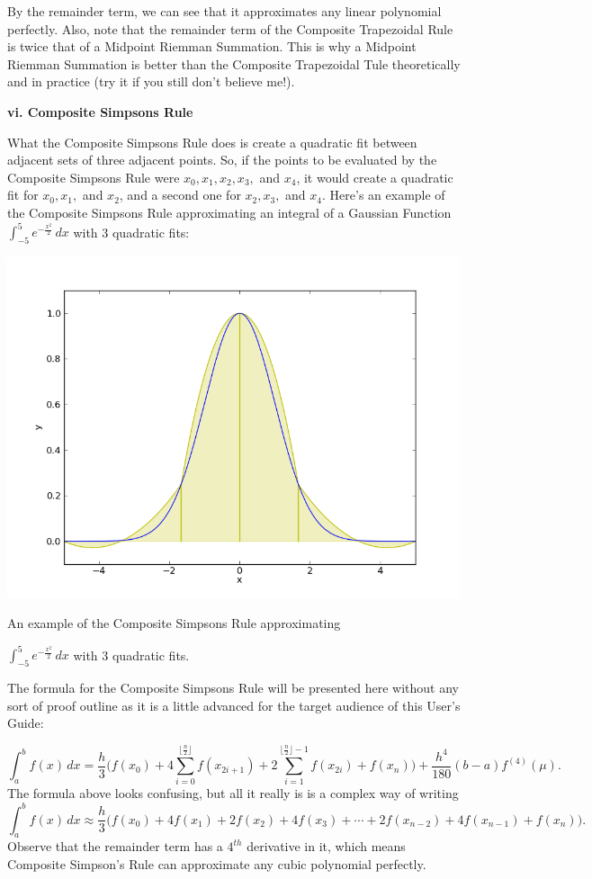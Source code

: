 \documentclass[12pt]{article}
\newcommand{\newLine}{\vspace{5mm}}
\newcommand{\nextsubsection}[1]{\newLine \noindent \large \textbf{#1} \normalsize}
\newcommand{\integral}[3]{\text{$\int^{#2}_{#1} #3\,dx$}}
\newcommand{\summation}[3]{\text{$\sum^{#2}_{#1} #3$}}
\newcommand{\floor}[1]{\text{$\lfloor#1\rfloor$}}
\begin{document}
By the remainder term, we can see that it approximates any linear polynomial perfectly. Also, note that the remainder term of the Composite Trapezoidal Rule is twice that of a Midpoint Riemman Summation. This is why a Midpoint Riemman Summation is better than the Composite Trapezoidal Tule theoretically and in practice (try it if you still don't believe me!).

\nextsubsection{vi. Composite Simpsons Rule}

\newLine What the Composite Simpsons Rule does is create a quadratic fit between adjacent sets of three adjacent points. So, if the points to be evaluated by the Composite Simpsons Rule were $x_0,x_1,x_2,x_3,$ and $x_4$, it would create a quadratic fit for $x_0, x_1,$ and $x_2$, and a second one for $x_2,x_3,$ and $x_4$. Here's an example of the Composite Simpsons Rule approximating an integral of a Gaussian Function $\integral{-5}{5}{e^{-\frac{x^2}{2}}}$ with 3 quadratic fits:

\begin{center} \includegraphics[scale = 0.5]{gaussianSimpsons.png} 

\small An example of the Composite Simpsons Rule approximating 

$\integral{-5}{5}{e^{-\frac{x^2}{2}}}$ with 3 quadratic fits.\normalsize
\end{center}
The formula for the Composite Simpsons Rule will be presented here without any sort of proof outline as it is a little advanced for the target audience of this User's Guide:

\begin{equation*}  \integral{a}{b}{f(x)} = \frac{h}{3}\Big(f(x_0) + 4\summation{i=0}{\floor{\frac{n}{2}}}{f(x_{2i+1})} + 2\summation{i=1}{\floor{\frac{n}{2}}-1}{f(x_{2i})} + f(x_n)\Big) + \frac{h^4}{180}(b-a)f^{(4)}(\mu). 
\end{equation*}
The formula above looks confusing, but all it really is is a complex way of writing
\begin{equation*}  \integral{a}{b}{f(x)} \approx \frac{h}{3}\big(f(x_0) + 4f(x_1)+2f(x_2)+4f(x_3)+\cdots+2f(x_{n-2})+4f(x_{n-1})+f(x_n)\big).
\end{equation*}
Observe that the remainder term has a $4^{th}$ derivative in it, which means Composite Simpson's Rule can approximate any cubic polynomial perfectly.
\end{document}
